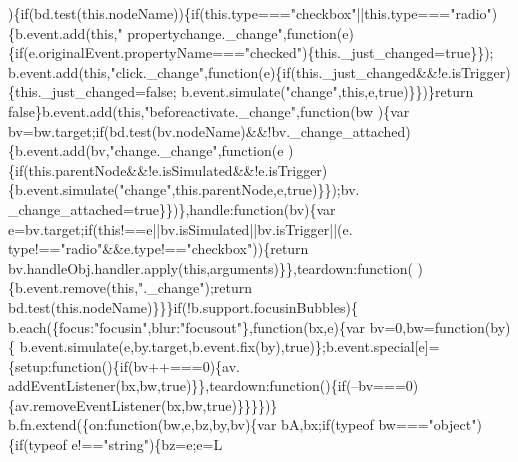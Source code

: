 \begin{DoxyCode}
      )\{\textcolor{keywordflow}{if}(bd.test(\textcolor{keyword}{this}.nodeName))\{\textcolor{keywordflow}{if}(this.type===\textcolor{stringliteral}{"checkbox"}||this.type===\textcolor{stringliteral}{"radio"})\{b.event.add(\textcolor{keyword}{this},\textcolor{stringliteral}{"
      propertychange.\_change"},\textcolor{keyword}{function}(e)\{\textcolor{keywordflow}{if}(e.originalEvent.propertyName===\textcolor{stringliteral}{"checked"})\{this.\_just\_changed=true\}\});
      b.event.add(\textcolor{keyword}{this},\textcolor{stringliteral}{"click.\_change"},\textcolor{keyword}{function}(e)\{\textcolor{keywordflow}{if}(this.\_just\_changed&&!e.isTrigger)\{this.\_just\_changed=false;
      b.event.simulate(\textcolor{stringliteral}{"change"},this,e,true)\}\})\}\textcolor{keywordflow}{return} \textcolor{keyword}{false}\}b.event.add(\textcolor{keyword}{this},\textcolor{stringliteral}{"beforeactivate.\_change"},\textcolor{keyword}{function}(bw
      )\{var bv=bw.target;if(bd.test(bv.nodeName)&&!bv.\_change\_attached)\{b.event.add(bv,\textcolor{stringliteral}{"change.\_change"},function(e
      )\{if(this.parentNode&&!e.isSimulated&&!e.isTrigger)\{b.event.simulate(\textcolor{stringliteral}{"change"},this.parentNode,e,true)\}\});bv.
      \_change\_attached=true\}\})\},handle:\textcolor{keyword}{function}(bv)\{var e=bv.target;\textcolor{keywordflow}{if}(\textcolor{keyword}{this}!==e||bv.isSimulated||bv.isTrigger||(e.
      type!==\textcolor{stringliteral}{"radio"}&&e.type!==\textcolor{stringliteral}{"checkbox"}))\{\textcolor{keywordflow}{return} bv.handleObj.handler.apply(\textcolor{keyword}{this},arguments)\}\},teardown:\textcolor{keyword}{function}(
      )\{b.event.remove(\textcolor{keyword}{this},\textcolor{stringliteral}{".\_change"});\textcolor{keywordflow}{return} bd.test(this.nodeName)\}\}\}\textcolor{keywordflow}{if}(!b.support.focusinBubbles)\{
      b.each(\{focus:\textcolor{stringliteral}{"focusin"},blur:\textcolor{stringliteral}{"focusout"}\},\textcolor{keyword}{function}(bx,e)\{var bv=0,bw=\textcolor{keyword}{function}(by)\{
      b.event.simulate(e,by.target,b.event.fix(by),\textcolor{keyword}{true})\};b.event.special[e]=\{setup:\textcolor{keyword}{function}()\{\textcolor{keywordflow}{if}(bv++===0)\{av.
      addEventListener(bx,bw,\textcolor{keyword}{true})\}\},teardown:\textcolor{keyword}{function}()\{\textcolor{keywordflow}{if}(--bv===0)\{av.removeEventListener(bx,bw,\textcolor{keyword}{true})\}\}\}\})\}
      b.fn.extend(\{on:function(bw,e,bz,by,bv)\{var bA,bx;if(typeof bw===\textcolor{stringliteral}{"object"})\{if(typeof e!==\textcolor{stringliteral}{"string"})\{bz=e;e=L

\end{DoxyCode}
